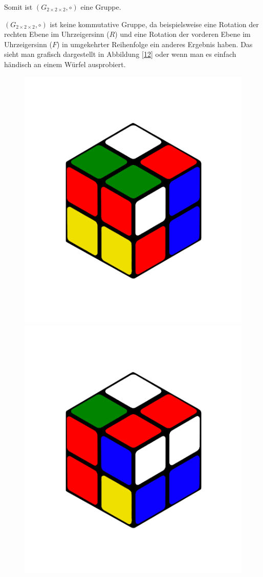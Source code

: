 \documentclass[12pt,a4paper, usenames, dvipsnames]{article}
\newcommand{\Gtwo}{\ensuremath{G_{2\times 2\times 2}}}
\begin{document}
Somit ist $(\Gtwo, \circ)$ eine Gruppe. 


$(\Gtwo, \circ)$ ist keine kommutative Gruppe, da beispielsweise eine Rotation der rechten Ebene im Uhrzeigersinn ($R$) und eine Rotation der vorderen Ebene im Uhrzeigersinn ($F$) in umgekehrter Reihenfolge ein anderes Ergebnis haben. Das sieht man grafisch dargestellt in Abbildung \ref{12} oder wenn man es einfach händisch an einem Würfel ausprobiert.
\begin{figure}[h]
\centering
\includegraphics[scale=0.1]{RF.png}
\includegraphics[scale=0.1]{FR.png}

\end{figure}
\end{document}
